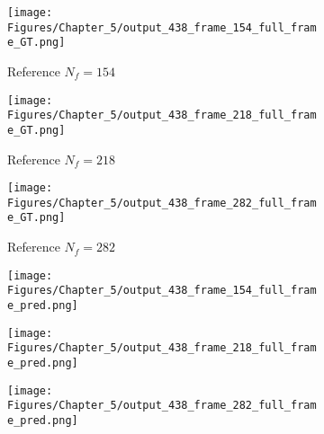 \begin{figure} [!ht]
	\centering
	\begin{subfigure}[b]{.32\textwidth}
		\centering
		\texttt{[image: Figures/Chapter\_5/output\_438\_frame\_154\_full\_frame\_GT.png]}
		\caption{Reference $N_f=154$}
		\label{fig:ref_438_full_154}
	\end{subfigure}
	\hfill
	\begin{subfigure}[b]{.32\textwidth}
		\centering
		\texttt{[image: Figures/Chapter\_5/output\_438\_frame\_218\_full\_frame\_GT.png]}
		\caption{Reference $N_f=218$}
		\label{fig:ref_438_full_218}
	\end{subfigure}
	\hfill
	\begin{subfigure}[b]{.32\textwidth}
		\centering
		\texttt{[image: Figures/Chapter\_5/output\_438\_frame\_282\_full\_frame\_GT.png]}
		\caption{Reference $N_f=282$}
		\label{fig:ref_438_full_282}	
	\end{subfigure}
	\hfill
	\begin{subfigure}[b]{.32\textwidth}
		\centering
		\texttt{[image: Figures/Chapter\_5/output\_438\_frame\_154\_full\_frame\_pred.png]}
		\caption{}
		\label{fig:pred_438_full_154}
	\end{subfigure}
	\hfill
	\begin{subfigure}[b]{.32\textwidth}
		\centering
		\texttt{[image: Figures/Chapter\_5/output\_438\_frame\_218\_full\_frame\_pred.png]}
		\caption{}
		\label{fig:pred_438_full_218}
	\end{subfigure}
	\hfill
	\begin{subfigure}[b]{.32\textwidth}
		\centering
		\texttt{[image: Figures/Chapter\_5/output\_438\_frame\_282\_full\_frame\_pred.png]}
		\caption{}
		\label{fig:pred_438_full_282}	
	\end{subfigure}
	\caption{}
	\label{fig:num_results_CS_438}
\end{figure}

